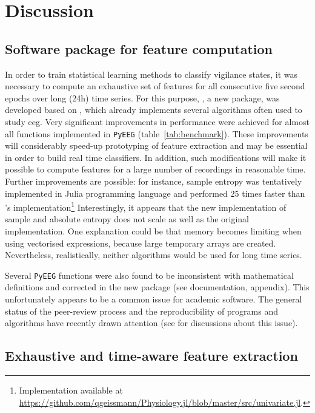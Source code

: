 \section{Discussion} \label{discussion}

\subsection{Software package for feature computation}
 
In order to train statistical learning methods to classify vigilance states,
it was necessary to compute an exhaustive set of features for all consecutive five second epochs
over long (24h) time series.
For this purpose, \pr{}, a new \py{} package, was developed based on
\pyeeg\cite{bao_pyeeg:_2011},  which already implements several
algorithms often used to study \gls{eeg}.
Very significant improvements in performance were achieved for almost all functions implemented in \texttt{PyEEG}
(table~\ref{tab:benchmark}). These improvements will considerably speed-up prototyping of feature extraction
and may be essential in order to build real time classifiers.
In addition, such modifications will make it possible to compute features for a large number
of recordings in reasonable time.
Further improvements are possible: for instance,
sample entropy was tentatively implemented in Julia programming language\cite{bezanson_julia:_2012}
and performed 25 times faster than \pr{}'s implementation\footnote{Implementation available at
\href{https://github.com/qgeissmann/Physiology.jl/blob/master/src/univariate.jl}{https://github.com/qgeissmann/Physiology.jl/blob/master/src/univariate.jl}.}
Interestingly, it appears that the new implementation of sample and
absolute entropy does not scale as well as the original implementation.
One explanation could be that memory becomes limiting when using vectorised expressions, because large temporary arrays are created.
Nevertheless, realistically, neither algorithms would be used for long time series.

Several \texttt{PyEEG} functions were also found to be inconsistent with mathematical
definitions and corrected in the new \pr{} package (see \pr{} documentation, appendix).
This unfortunately appears to be a common issue for academic software.
The general status of the peer-review process and the reproducibility of programs and algorithms have
recently drawn attention (see \cite{morin_shining_2012,crick_can_2014} for
discussions about this issue).

\subsection{Exhaustive and time-aware feature extraction}


